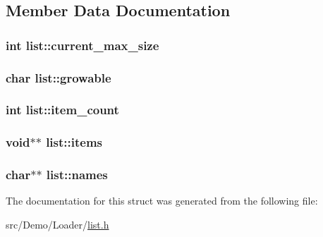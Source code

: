 \subsection{Member Data Documentation}
\hypertarget{structlist_af13cdd9f7d31327fc22ed5da5623aa27}{
\subsubsection[{current\+\_\+max\+\_\+size}]{\setlength{\rightskip}{0pt plus 5cm}int list\+::current\+\_\+max\+\_\+size}}\label{structlist_af13cdd9f7d31327fc22ed5da5623aa27}
\hypertarget{structlist_a7da9bddee81290f233d7ec41f26824f3}{
\subsubsection[{growable}]{\setlength{\rightskip}{0pt plus 5cm}char list\+::growable}}\label{structlist_a7da9bddee81290f233d7ec41f26824f3}
\hypertarget{structlist_a1e4f9682bfdc33db2d825fd41658a88d}{
\subsubsection[{item\+\_\+count}]{\setlength{\rightskip}{0pt plus 5cm}int list\+::item\+\_\+count}}\label{structlist_a1e4f9682bfdc33db2d825fd41658a88d}
\hypertarget{structlist_ade0b0790a7fd4f3b65aae379d5a7da85}{
\subsubsection[{items}]{\setlength{\rightskip}{0pt plus 5cm}void$\ast$$\ast$ list\+::items}}\label{structlist_ade0b0790a7fd4f3b65aae379d5a7da85}
\hypertarget{structlist_a1b3f452b7de983fc5b841f4569285e57}{
\subsubsection[{names}]{\setlength{\rightskip}{0pt plus 5cm}char$\ast$$\ast$ list\+::names}}\label{structlist_a1b3f452b7de983fc5b841f4569285e57}


The documentation for this struct was generated from the following file\+:\begin{DoxyCompactItemize}
\item 
src/\+Demo/\+Loader/\hyperlink{_demo_2_loader_2_list_8h}{list.\+h}\end{DoxyCompactItemize}
